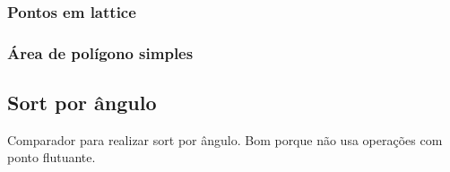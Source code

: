 \subsubsection{Pontos em lattice}
\divisor

\subsubsection{\'{A}rea de pol\'{i}gono simples}
\divisor

\subsection{Sort por \^{a}ngulo}
Comparador para realizar sort por \^{a}ngulo. Bom porque n\~{a}o usa opera\c{c}\~{o}es com ponto flutuante.
\divisor
